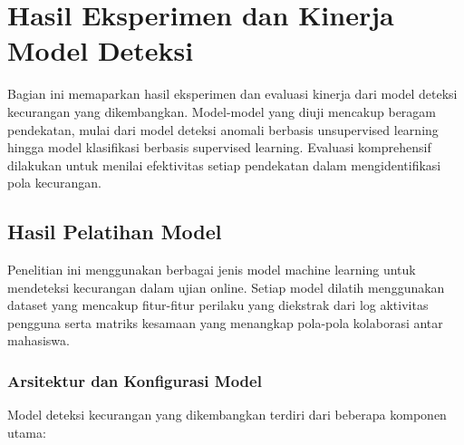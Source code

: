 \section{Hasil Eksperimen dan Kinerja Model Deteksi}
\label{sec:hasilEksperimen}

Bagian ini memaparkan hasil eksperimen dan evaluasi kinerja dari model deteksi kecurangan yang dikembangkan. Model-model yang diuji mencakup beragam pendekatan, mulai dari model deteksi anomali berbasis unsupervised learning hingga model klasifikasi berbasis supervised learning. Evaluasi komprehensif dilakukan untuk menilai efektivitas setiap pendekatan dalam mengidentifikasi pola kecurangan.

\subsection{Hasil Pelatihan Model}
\label{subsec:hasilPelatihanModel}

Penelitian ini menggunakan berbagai jenis model machine learning untuk mendeteksi kecurangan dalam ujian online. Setiap model dilatih menggunakan dataset yang mencakup fitur-fitur perilaku yang diekstrak dari log aktivitas pengguna serta matriks kesamaan yang menangkap pola-pola kolaborasi antar mahasiswa.

\subsubsection{Arsitektur dan Konfigurasi Model}

Model deteksi kecurangan yang dikembangkan terdiri dari beberapa komponen utama:

